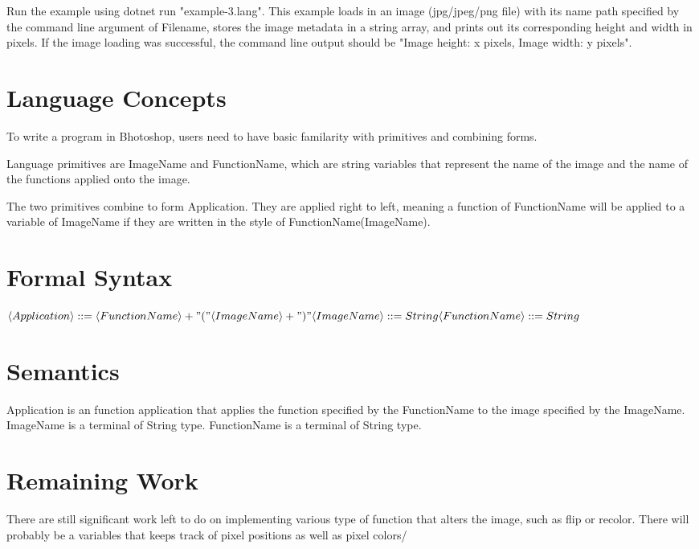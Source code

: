 \documentclass{article}
\begin{document}
Run the example using dotnet run "example-3.lang". This example loads in an image  (jpg/jpeg/png file) with its name path specified by the command line argument of Filename, stores the image metadata in a string array, and prints out its corresponding height and width in pixels. If the image loading was successful, the command line output should be "Image height: x pixels, Image width: y pixels".

\section{Language Concepts}

To write a program in Bhotoshop, users need to have basic familarity with primitives and combining forms. 
    
Language primitives are ImageName and FunctionName, which are string variables that represent the name of the image and the name of the functions applied onto the image. 

The two primitives combine to form Application. They are applied right to left, meaning a function of FunctionName will be applied to a variable of ImageName if they are written in the style of FunctionName(ImageName).

\section{Formal Syntax}

$
\langle Application \rangle ::= \langle FunctionName \rangle + "(" \langle ImageName \rangle + ")" \\
\\ \langle ImageName \rangle ::= String
\\ \langle FunctionName \rangle ::= String
$

\section{Semantics}

Application is an function application that applies the function specified by the FunctionName to the image specified by the ImageName. 
ImageName is a terminal of String type. 
FunctionName is a terminal of String type. 

\section{Remaining Work}
There are still significant work left to do on implementing various type of function that alters the image, such as flip or recolor. There will probably be a variables that keeps track of pixel positions as well as pixel colors/ 
\end{document}
